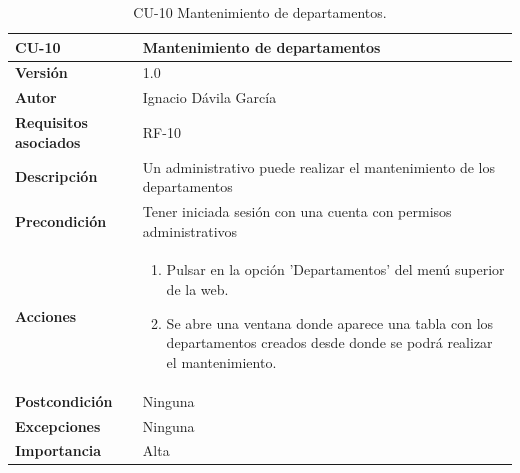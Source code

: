 \begin{table}[p]
	\centering
	\begin{tabularx}{\linewidth}{ p{} p{} }
		\toprule
		\textbf{CU-10}    & \textbf{Mantenimiento de departamentos}\\
		\toprule
		\textbf{Versión}              & 1.0    \\
		\textbf{Autor}                & Ignacio Dávila García \\
		\textbf{Requisitos asociados} & RF-10 \\
		\textbf{Descripción}          & Un administrativo puede realizar el mantenimiento de los departamentos \\
		\textbf{Precondición}         & Tener iniciada sesión con una cuenta con permisos administrativos \\
		\textbf{Acciones}             &
		\begin{enumerate}
			\def\labelenumi{\arabic{enumi}.}
			\tightlist
			\item Pulsar en la opción 'Departamentos' del menú superior de la web.
			\item Se abre una ventana donde aparece una tabla con los departamentos creados desde donde se podrá realizar el mantenimiento.
		\end{enumerate}\\
		\textbf{Postcondición}        & Ninguna \\
		\textbf{Excepciones}          & Ninguna \\
		\textbf{Importancia}          & Alta \\
		\bottomrule
	\end{tabularx}
	\caption{CU-10 Mantenimiento de departamentos.}
\end{table}

